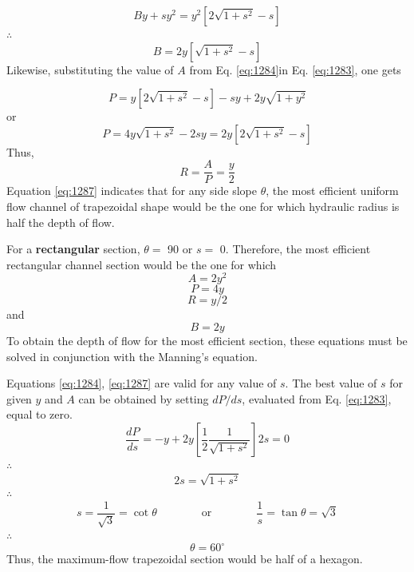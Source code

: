 \documentclass[a4paper, 12pt, british]{article} %
\numberwithin{equation}{section}
\numberwithin{figure}{section}
\numberwithin{table}{section}
\begin{document}
\begin{equation*}
By + sy^2 = y^2 \left [ 2 \sqrt{1 + s^2} - s \right ]
\end{equation*}
$\therefore$
\begin{equation}
B = 2y  \left [ \sqrt{1 + s^2} - s \right ]
\label{eq:1285}
\end{equation}
Likewise, substituting the value of $A$ from Eq. \ref{eq:1284}in
Eq. \ref{eq:1283}, one gets

\begin{equation*}
P = y \left [ 2 \sqrt{1 + s^2} - s \right ] - sy + 2y \sqrt{1 + y^2}
\end{equation*}
or
\begin{equation}
P = 4y \sqrt{1 + s^2} - 2sy = 2y\left [ 2 \sqrt{1 + s^2} - s \right ]
\label{eq:1286}
\end{equation}
Thus,
\begin{equation}
R = \frac{A}{P} = \frac{y}{2}
\label{eq:1287}
\end{equation}
Equation  \ref{eq:1287} indicates that for any side slope $\theta$, 
the most efficient uniform flow channel of trapezoidal
shape would be the one for which hydraulic radius is
half the depth of flow. 

For a \textbf{rectangular} section, $\theta =$ 90 or $s=$ 0.
Therefore, the most efficient rectangular channel section
would be the one for which 
\begin{equation*}
A = 2y^2
\label{eq:1288}
\end{equation*}
\begin{equation}
P = 4y
\label{eq:1289}
\end{equation}
\begin{equation}
R = y/2
\label{eq:12810}
\end{equation}
and
\begin{equation}
B = 2y
\label{eq:12811a}
\end{equation}
To obtain the depth of flow for the most efficient section,
these equations must be solved in conjunction with
the Manning's equation.

Equations \ref{eq:1284}, \ref{eq:1287} are valid for any value of $s$.
The best value of $s$ for given $y$ and $A$ can be obtained
by setting $dP/ds$, evaluated from Eq. \ref{eq:1283}, equal to zero. 
\begin{equation*}
\frac{dP}{ds} = -y +2y\left [ \frac{1}{2} \frac{1}{\sqrt{1 + s^2}} \right ] 2s = 0
\end{equation*}
$\therefore$
\begin{equation*}
2s = \sqrt{1 + s^2}
\end{equation*}
$\therefore$
\begin{equation*}
s = \frac{1}{\sqrt{3}} = \cot \theta \qquad \qquad \text{or} \qquad\qquad \frac{1}{s} = \tan \theta = \sqrt{3}
\end{equation*}
$\therefore$
\begin{equation*}
\theta = 60^\circ
\end{equation*}
Thus, the maximum-flow trapezoidal section would be half of a hexagon.
\end{document}
